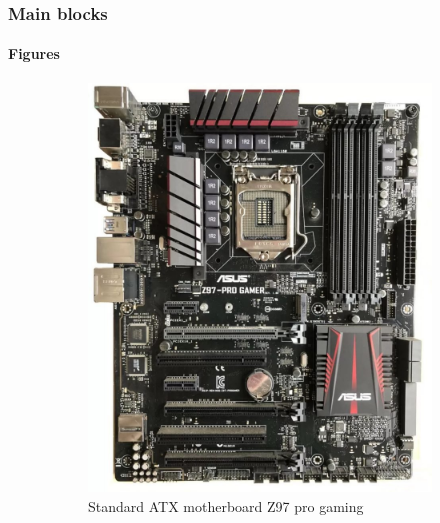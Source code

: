 \documentclass[
	12pt, %
]{beamer}
\begin{document}
\begin{frame}
	\frametitle{Main blocks}
	\framesubtitle{Figures}
	\begin{figure}
		\centering
		\begin{subfigure}[b]{0.3\textwidth}
			\centering
			\includegraphics[width=1.1\linewidth]{Images/img2.jpg}
			\caption{Standard ATX motherboard Z97 pro gaming}
			\label{Z97}
		\end{subfigure}
		\hfill
		\begin{subfigure}[b]{0.3\textwidth}
			\centering

\end{subfigure}
\end{figure}
\end{frame}
\end{document}
